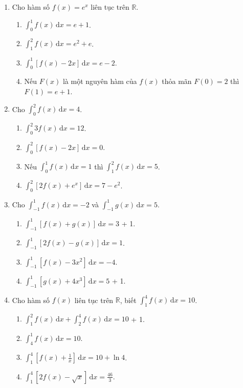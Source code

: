 \documentclass[12pt]{article}
\begin{document}
	\begin{enumerate}[label=\textbf{Câu \arabic*.}]
		\item Cho hàm số $f(x) = e^x$ liên tục trên $\mathbb{R}$.
		\begin{enumerate}[label=\alph*)]			\item $\displaystyle \int_0^1 f(x)\,\mathrm{d}x = e + 1$.
			\item $\displaystyle \int_1^2 f(x)\,\mathrm{d}x = e^2 + e$.
			\item $\displaystyle \int_0^1 [f(x) - 2x]\,\mathrm{d}x = e - 2$.
			\item Nếu $F(x)$ là một nguyên hàm của $f(x)$ thỏa mãn $F(0) = 2$ thì $F(1) = e + 1$.
\end{enumerate}
	
		\item Cho $\displaystyle \int_0^2 f(x)\,\mathrm{d}x = 4$.
		\begin{enumerate}[label=\alph*)]			\item $\displaystyle \int_0^2 3f(x)\,\mathrm{d}x = 12$.
			\item $\displaystyle \int_0^2 [f(x) - 2x]\,\mathrm{d}x = 0$.
			\item Nếu $\displaystyle \int_0^1 f(x)\,\mathrm{d}x = 1$ thì $\displaystyle \int_1^2 f(x)\,\mathrm{d}x = 5$.
			\item $\displaystyle \int_0^2 [2f(x) + e^x]\,\mathrm{d}x = 7 - e^2$.
\end{enumerate}
		
		\item Cho $\displaystyle \int_{-1}^1 f(x)\,\mathrm{d}x = -2$ và $\displaystyle \int_{-1}^1 g(x)\,\mathrm{d}x = 5$.
		\begin{enumerate}[label=\alph*)]			\item $\displaystyle \int_{-1}^1 [f(x) + g(x)]\,\mathrm{d}x = 3$ + 1.
			\item $\displaystyle \int_{-1}^1 [2f(x) - g(x)]\,\mathrm{d}x = 1$.
			\item $\displaystyle \int_{-1}^1 [f(x) - 3x^2]\,\mathrm{d}x = -4$.
			\item $\displaystyle \int_{-1}^1 [g(x) + 4x^3]\,\mathrm{d}x = 5$ + 1.
\end{enumerate}
		
		\item Cho hàm số $f(x)$ liên tục trên $\mathbb{R}$, biết $\displaystyle \int_1^4 f(x)\,\mathrm{d}x = 10$.
		\begin{enumerate}[label=\alph*)]			\item $\displaystyle \int_1^2 f(x)\,\mathrm{d}x + \int_2^4 f(x)\,\mathrm{d}x = 10$ + 1.
			\item $\displaystyle \int_4^1 f(x)\,\mathrm{d}x = 10$.
			\item $\displaystyle \int_1^4 \left[f(x) + \frac{1}{x}\right]\,\mathrm{d}x = 10 + \ln 4$.
			\item $\displaystyle \int_1^4 [2f(x) - \sqrt{x}]\,\mathrm{d}x = \frac{46}{3}$.
\end{enumerate}
		

\end{enumerate}
\end{document}
